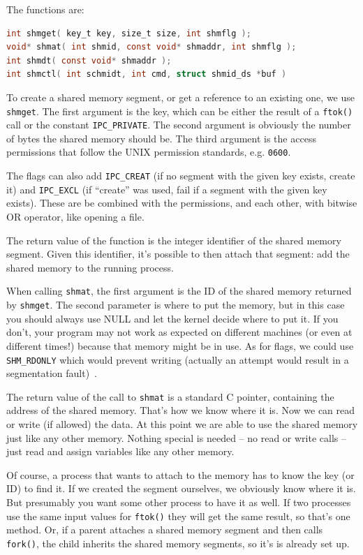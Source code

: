 The functions are:

\begin{lstlisting}[language=C]
int shmget( key_t key, size_t size, int shmflg );
void* shmat( int shmid, const void* shmaddr, int shmflg );
int shmdt( const void* shmaddr );
int shmctl( int schmidt, int cmd, struct shmid_ds *buf )
\end{lstlisting}

To create a shared memory segment, or get a reference to an existing one, we use \texttt{shmget}. The first argument is the key, which can be either the result of a \texttt{ftok()} call or the constant \texttt{IPC\_PRIVATE}. The second argument is obviously the number of bytes the shared memory should be. The third argument is the access permissions that follow the UNIX permission standards, e.g. \texttt{0600}.

The flags can also add \texttt{IPC\_CREAT} (if no segment with the given key exists, create it) and \texttt{IPC\_EXCL} (if ``create'' was used, fail if a segment with the given key exists). These are be combined with the permissions, and each other, with bitwise OR operator, like opening a file.

The return value of the function is the integer identifier of the shared memory segment. Given this identifier, it's possible to then attach that segment: add the shared memory to the running process.

When calling \texttt{shmat}, the first argument is the ID of the shared memory returned by \texttt{shmget}. The second parameter is where to put the memory, but in this case you should always use NULL and let the kernel decide where to put it. If you don't, your program may not work as expected on different machines (or even at different times!) because that memory might be in use. As for flags, we could use \texttt{SHM\_RDONLY} which would prevent writing (actually an attempt would result in a segmentation fault)~\cite{lpi}.

The return value of the call to \texttt{shmat} is a standard C pointer, containing the address of the shared memory. That's how we know where it is. Now we can read or write (if allowed) the data. At this point we are able to use the shared memory just like any other memory. Nothing special is needed -- no read or write calls -- just read and assign variables like any other memory.

Of course, a process that wants to attach to the memory has to know the key (or ID) to find it. If we created the segment ourselves, we obviously know where it is. But presumably you want some other process to have it as well. If two processes use the same input values for \texttt{ftok()} they will get the same result, so that's one method. Or, if a parent attaches a shared memory segment and then calls \texttt{fork()}, the child inherits the shared memory segments, so it's is already set up.

